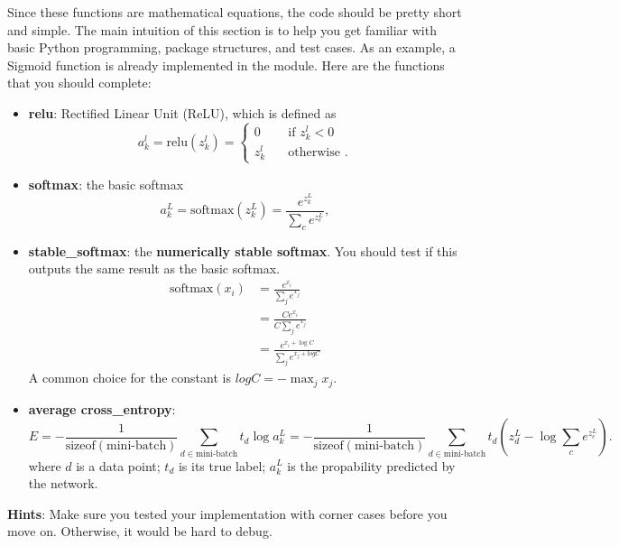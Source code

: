 \documentclass{article}
\begin{document}
Since these
functions are mathematical equations, the code should be pretty short
and simple. The main intuition of this section is to help you get familiar
with basic Python programming, package structures, and test cases. As an
example, a Sigmoid function is already implemented in the module. Here are
the functions that you should complete:
\begin{itemize}
\item \textbf{relu}: Rectified Linear Unit (ReLU), which is defined as
  \begin{equation*}
    a_k^l = \text{relu}(z_k^l) =
    \begin{cases}
      0       & \quad \text{if } z_k^l < 0\\
      z_k^l  & \quad \text{otherwise }.
    \end{cases}
\end{equation*}

\item \textbf{softmax}: the basic softmax
  \begin{equation}
  a_k^L = \text{softmax}(z_k^L) = \frac{e^{z_k^L}}{\sum_{c} e^{z_c^L}},
  \end{equation}

\item \textbf{stable\_softmax}: the \textbf{numerically stable softmax}. You should test
if this outputs the same result as the basic softmax.
\begin{align}
\text{softmax}(x_i) &= \frac{e^{x_i}}{\sum_j e^{x_j}} \\
&= \frac{C e^{x_i}}{C \sum_j e^{x_j}} \\
&= \frac{e^{x_i+\log C}}{\sum_j e^{x_j + log C}}
\end{align}
A common choice for the constant is $log C = -\max_{j} x_j$.

\item \textbf{average cross\_entropy}:
\begin{equation}
E = - \frac{1}{\text{sizeof}(\text{mini-batch})}\sum_{d \in  \text{mini-batch}} t_d \log a_k^L = - \frac{1}{\text{sizeof}(\text{mini-batch})} \sum_{d \in \text{mini-batch}} t_d (z_d^L - \log \sum_c e^{z_c^L}).
\end{equation}
where \(d\) is a data point; \(t_d\) is its true label; \(a_k^L\) is the
propability predicted by the network.

\end{itemize}

\noindent \textbf{Hints}: Make sure you tested your implementation with corner
cases before you move on. Otherwise, it would be hard to debug.
\end{document}
